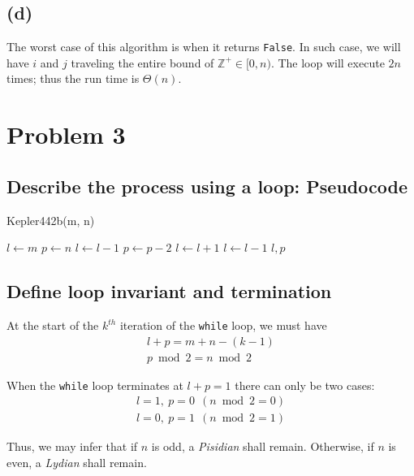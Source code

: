 \documentclass[12pt]{article}
\newcommand{\inlinecode}{\texttt}
\begin{document}
\subsection{(d)}
The worst case of this algorithm is when it returns \inlinecode{False}. In such case, we will have $i$ and $j$ traveling the entire bound of $\mathbb{Z^+} \in [0, n)$. The loop will execute $2n$ times; thus the run time is $\Theta(n)$.

\section{Problem 3}
\subsection{Describe the process using a loop: Pseudocode}

\begin{algorithm}
\caption{Kepler442b(m, n)}\label{Kepler442b}
\begin{algorithmic}[1]
\Procedure{}{}
\State $l \gets m$
\State $p \gets n$
    \State {}
        \State $l \gets l - 1$
        \State $p \gets p - 2$
        \State $l \gets l + 1$
    \Else
        \State $l \gets l - 1$
    \EndIf
\EndWhile
\State \Return $l, p$
\EndProcedure
\end{algorithmic}
\end{algorithm}

\subsection{Define loop invariant and termination}
At the start of the $k^{th}$ iteration of the \inlinecode{while} loop, we must have
\begin{gather}
    l + p = m + n - (k - 1) \\
    p\bmod 2 = n \bmod 2
\end{gather}

When the \inlinecode{while} loop terminates at $l + p = 1$ there can only be two cases:
\begin{gather}
    l = 1, \ p = 0 \ \ (n \bmod 2 = 0) \\
    l = 0, \ p = 1 \ \ (n \bmod 2 = 1)
\end{gather}

Thus, we may infer that if $n$ is odd, a \textit{Pisidian} shall remain. Otherwise, if $n$ is even, a \textit{Lydian} shall remain.
\end{document}
